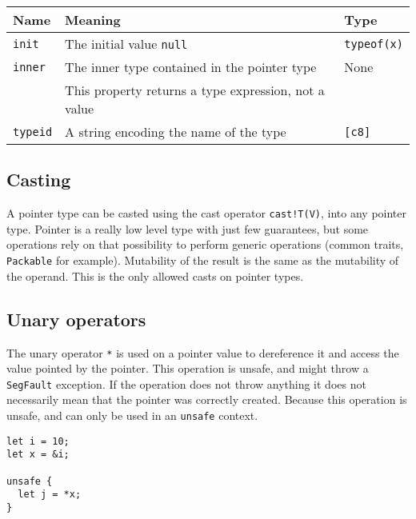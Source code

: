 \vspace{-20pt}%
\begin{center}\begin{adjustbox}{max width=\linewidth}
  \begin{tabular}{|l|ll|}
    \hline
    Name & Meaning & Type\\
    \hline
    \hline
    \texttt{init} & The initial value \texttt{null} & \texttt{typeof(x)}\\
    \texttt{inner} & The inner type contained in the pointer type & None\\
    & This property returns a type expression, not a value &\\
    \hline
    \texttt{typeid} & A string encoding the name of the type & \texttt{[c8]} \\
    \hline
  \end{tabular}
\end{adjustbox}\end{center}

\subsection {Casting}

A pointer type can be casted using the cast operator \texttt{cast!T(V)}, into
any pointer type. Pointer is a really low level type with just few guarantees,
but some operations rely on that possibility to perform generic operations
(common traits, \texttt{Packable} for example). Mutability of the result is the
same as the mutability of the operand. This is the only allowed casts on pointer
types.

\subsection {Unary operators}

The unary operator \texttt{*} is used on a pointer value to dereference it and
access the value pointed by the pointer. This operation is unsafe, and might
throw a \texttt{SegFault} exception. If the operation does not throw anything it
does not necessarily mean that the pointer was correctly created. Because this
operation is unsafe, and can only be used in an \texttt{unsafe} context.

\begin{lstlisting}[style=coloredverbatim]
let i = 10;
let x = &i;

unsafe {
  let j = *x;
}
\end{lstlisting}

